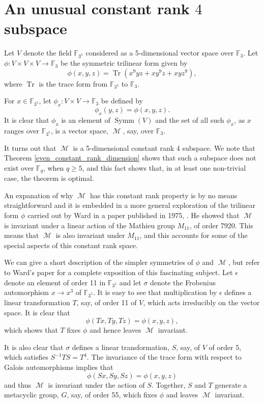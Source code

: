 \documentclass{amsart}
\DeclareMathOperator{\Tr}{Tr}
\DeclareMathOperator{\M}{\mathcal{M}}
\DeclareMathOperator{\Symm}{Symm}
\theoremstyle{plain}
\theoremstyle{definition}
\begin{document}
\section{An unusual constant rank $4$ subspace}

\noindent Let $V$ denote the field $\mathbb{F}_{3^5}$ considered as a 5-dimensional vector space over $\mathbb{F}_{3}$. Let $\phi: V\times V\times V\to  \mathbb{F}_{3}$ be the symmetric trilinear form given by
\[
 \phi(x,y,z)=\Tr (x^9yz+xy^9z+xyz^9),
\]
where $\Tr$ is the trace form from $\mathbb{F}_{3^5}$ to $\mathbb{F}_{3}$. 

For $x\in \mathbb{F}_{3^5}$, let $\phi_x:V\times V\to \mathbb{F}_{3}$ be defined by
\[
 \phi_x(y,z)=\phi(x,y,z).
\]
It is clear that $\phi_x$ is an element of $\Symm(V)$ and the set of all such $\phi_x$, as $x$ ranges over $\mathbb{F}_{3^5}$, is a vector space, $\M$, say, over $\mathbb{F}_{3}$.  

It turns out that $\M$ is a 5-dimensional constant rank 4 subspace. We note that Theorem \ref{even_constant_rank_dimension} shows
that such a subspace does not exist over $\mathbb{F}_{q}$, when $q\geq 5$, and this fact shows that, in at least one non-trivial case,
the theorem is optimal. 

An expanation of why $\M$ has this constant rank property is by no means straightforward and it is embedded in a more general exploration
of the trilinear form $\phi$ carried out by Ward in a paper published in 1975, \cite{Ward}. He showed that $\M$ is  invariant under a linear action of the Mathieu group $M_{11}$, of order 7920. This means that $\M$ is also invariant under $M_{11}$, and this accounts for some of the special aspects of this constant rank space. 

We can give a short description of the simpler symmetries of $\phi$ and $\M$, but refer to Ward's paper for a complete exposition of this fascinating subject. Let $\epsilon$ denote an element of order 11 in $\mathbb{F}_{3^5}$ and let $\sigma$ denote the Frobenius automorphism
$x\to x^3$ of $\mathbb{F}_{3^5}$. It is easy to see that multiplication by $\epsilon$ defines a linear transformation $T$, say, of order 11 of $V$, which acts irreducibly on the vector space. It is clear that 
\[
 \phi(Tx,Ty,Tz)=\phi(x,y,z),
\]
which shows that $T$ fixes $\phi$ and hence leaves $\M$ invariant. 

It is also clear that $\sigma$ defines a linear transformation, $S$, say, of $V$  of order 5, which satisfies
$S^{-1}TS=T^4$. The invariance of the trace form with respect to Galois automorphisms implies that
\[
 \phi(Sx,Sy,Sz)=\phi(x,y,z)
\]
and thus $\M$ is  invariant under the action of $S$. Together, $S$ and $T$ generate a metacyclic group, $G$, say, of order 55, which fixes
$\phi$ and leaves $\M$ invariant.
\end{document}
